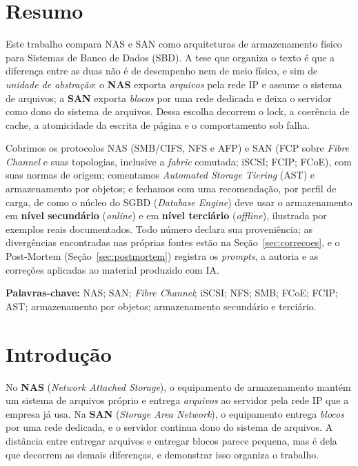 \documentclass[11pt,a4paper]{article}
\begin{document}
\section*{Resumo}

Este trabalho compara NAS e SAN como arquiteturas de armazenamento físico para Sistemas de Banco de
Dados (SBD). A tese que organiza o texto é que a diferença entre as duas não é de desempenho nem de
meio físico, e sim de \emph{unidade de abstração}: o \textbf{NAS} exporta \emph{arquivos} pela rede IP
e assume o sistema de arquivos; a \textbf{SAN} exporta \emph{blocos} por uma rede dedicada e deixa o
servidor como dono do sistema de arquivos. Dessa escolha decorrem o lock, a coerência de cache, a
atomicidade da escrita de página e o comportamento sob falha.

Cobrimos os protocolos NAS (SMB/CIFS, NFS e AFP) e SAN (FCP sobre \textit{Fibre Channel} e suas
topologias, inclusive a \textit{fabric} comutada; iSCSI; FCIP; FCoE), com suas normas de origem;
comentamos \textit{Automated Storage Tiering} (AST) e armazenamento por objetos; e fechamos com uma
recomendação, por perfil de carga, de como o núcleo do SGBD (\textit{Database Engine}) deve usar o
armazenamento em \textbf{nível secundário} (\textit{online}) e em \textbf{nível terciário}
(\textit{offline}), ilustrada por exemplos reais documentados. Todo número declara sua proveniência;
as divergências encontradas nas próprias fontes estão na Seção~\ref{sec:correcoes}, e o Post-Mortem
(Seção~\ref{sec:postmortem}) registra os \textit{prompts}, a autoria e as correções aplicadas ao
material produzido com IA.

\smallskip
\noindent\textbf{Palavras-chave:} NAS; SAN; \textit{Fibre Channel}; iSCSI; NFS; SMB; FCoE; FCIP;
AST; armazenamento por objetos; armazenamento secundário e terciário.

\vspace{6mm}
\tableofcontents
\clearpage

\section{Introdução}
\label{sec:metodologia}

No \textbf{NAS} (\textit{Network Attached Storage}), o equipamento de armazenamento mantém um sistema
de arquivos próprio e entrega \emph{arquivos} ao servidor pela rede IP que a empresa já usa. Na
\textbf{SAN} (\textit{Storage Area Network}), o equipamento entrega \emph{blocos} por uma rede
dedicada, e o servidor continua dono do sistema de arquivos. A distância entre entregar arquivos e
entregar blocos parece pequena, mas é dela que decorrem as demais diferenças, e demonstrar isso
organiza o trabalho.
\end{document}
